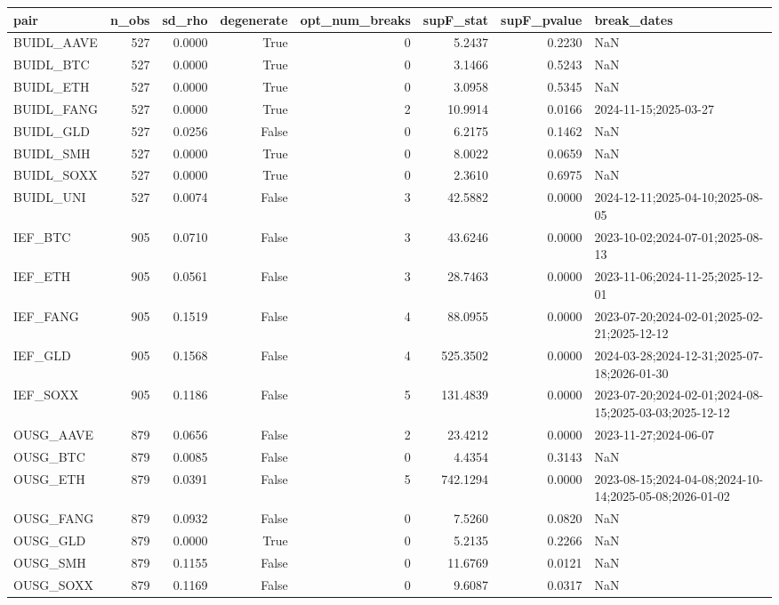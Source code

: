\begin{tabular}{lrrrrrrl}
\toprule
pair & n\_obs & sd\_rho & degenerate & opt\_num\_breaks & supF\_stat & supF\_pvalue & break\_dates \\
\midrule
BUIDL\_AAVE & 527 & 0.0000 & True & 0 & 5.2437 & 0.2230 & NaN \\
BUIDL\_BTC & 527 & 0.0000 & True & 0 & 3.1466 & 0.5243 & NaN \\
BUIDL\_ETH & 527 & 0.0000 & True & 0 & 3.0958 & 0.5345 & NaN \\
BUIDL\_FANG & 527 & 0.0000 & True & 2 & 10.9914 & 0.0166 & 2024-11-15;2025-03-27 \\
BUIDL\_GLD & 527 & 0.0256 & False & 0 & 6.2175 & 0.1462 & NaN \\
BUIDL\_SMH & 527 & 0.0000 & True & 0 & 8.0022 & 0.0659 & NaN \\
BUIDL\_SOXX & 527 & 0.0000 & True & 0 & 2.3610 & 0.6975 & NaN \\
BUIDL\_UNI & 527 & 0.0074 & False & 3 & 42.5882 & 0.0000 & 2024-12-11;2025-04-10;2025-08-05 \\
IEF\_BTC & 905 & 0.0710 & False & 3 & 43.6246 & 0.0000 & 2023-10-02;2024-07-01;2025-08-13 \\
IEF\_ETH & 905 & 0.0561 & False & 3 & 28.7463 & 0.0000 & 2023-11-06;2024-11-25;2025-12-01 \\
IEF\_FANG & 905 & 0.1519 & False & 4 & 88.0955 & 0.0000 & 2023-07-20;2024-02-01;2025-02-21;2025-12-12 \\
IEF\_GLD & 905 & 0.1568 & False & 4 & 525.3502 & 0.0000 & 2024-03-28;2024-12-31;2025-07-18;2026-01-30 \\
IEF\_SOXX & 905 & 0.1186 & False & 5 & 131.4839 & 0.0000 & 2023-07-20;2024-02-01;2024-08-15;2025-03-03;2025-12-12 \\
OUSG\_AAVE & 879 & 0.0656 & False & 2 & 23.4212 & 0.0000 & 2023-11-27;2024-06-07 \\
OUSG\_BTC & 879 & 0.0085 & False & 0 & 4.4354 & 0.3143 & NaN \\
OUSG\_ETH & 879 & 0.0391 & False & 5 & 742.1294 & 0.0000 & 2023-08-15;2024-04-08;2024-10-14;2025-05-08;2026-01-02 \\
OUSG\_FANG & 879 & 0.0932 & False & 0 & 7.5260 & 0.0820 & NaN \\
OUSG\_GLD & 879 & 0.0000 & True & 0 & 5.2135 & 0.2266 & NaN \\
OUSG\_SMH & 879 & 0.1155 & False & 0 & 11.6769 & 0.0121 & NaN \\
OUSG\_SOXX & 879 & 0.1169 & False & 0 & 9.6087 & 0.0317 & NaN \\

\end{tabular}
